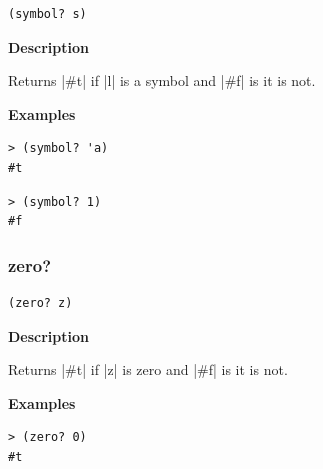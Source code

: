 \documentclass[a4paper]{article}
\begin{document}
\begin{lstlisting}[frame=none]
(symbol? s)
\end{lstlisting}

\textbf{Description}

Returns |#t| if |l| is a symbol and |#f| is it is not.

\textbf{Examples}

\begin{lstlisting}
> (symbol? 'a)
#t
\end{lstlisting}

\begin{lstlisting}
> (symbol? 1)
#f
\end{lstlisting}

\subsubsection{zero?}

\begin{lstlisting}[frame=none]
(zero? z)
\end{lstlisting}

\textbf{Description}

Returns |#t| if |z| is zero and |#f| is it is not.

\textbf{Examples}

\begin{lstlisting}
> (zero? 0)
#t
\end{lstlisting}
\end{document}
